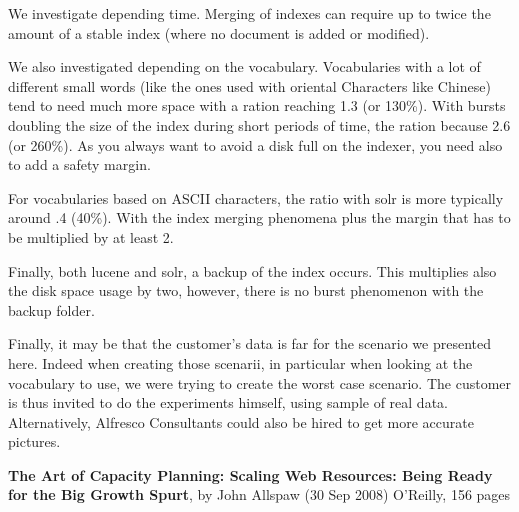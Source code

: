\documentclass[12pt,a4]{article}
\begin{document}
We investigate depending time.
Merging of indexes can require up to twice the amount of a stable index (where no document is added or modified).

We also investigated depending on the vocabulary. Vocabularies with a lot of different small words (like the ones used with oriental Characters like Chinese) tend to need much more space with a ration reaching 1.3 (or 130\%). With bursts doubling the size of the index during short periods of time, the ration because 2.6 (or 260\%). As you always want to avoid a disk full on the indexer, you need also to add a safety margin.

For vocabularies based on ASCII characters, the ratio with solr is more typically around .4 (40\%). With the index merging phenomena plus the margin that has to be multiplied by at least 2.

Finally, both lucene and solr, a backup of the index occurs. This multiplies also the disk space usage by two, however, there is no burst phenomenon with the backup folder.

Finally, it may be that the customer's data is far for the scenario we presented here. Indeed when creating those scenarii, in particular when looking at the vocabulary to use, we were trying to create the worst case scenario.
The customer is thus invited to do the experiments himself, using sample of real data. Alternatively, Alfresco Consultants could also be hired to get more accurate pictures.


\begin{thebibliography}{9}

{\bf The Art of Capacity Planning: Scaling Web Resources: Being Ready for the Big Growth Spurt}, by John Allspaw (30 Sep 2008)
O'Reilly, 156 pages
 \end{thebibliography}
\end{document}
